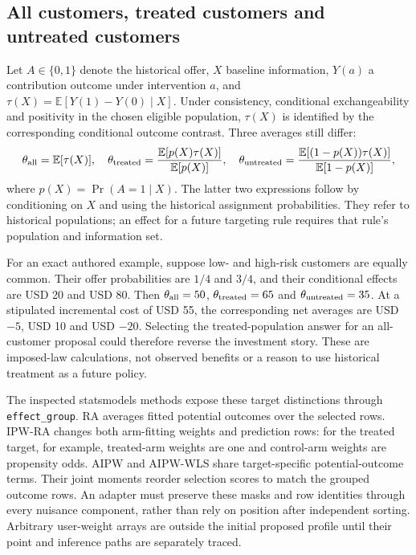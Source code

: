 \subsection{All customers, treated customers and untreated customers}
\label{exec20:pyfx-population}
Let $A\in\{0,1\}$ denote the historical offer, $X$ baseline information,
$Y(a)$ a contribution outcome under intervention $a$, and
$\tau(X)=\mathbb E[Y(1)-Y(0)\mid X]$. Under consistency, conditional
exchangeability and positivity in the chosen eligible population,
$\tau(X)$ is identified by the corresponding conditional outcome contrast.
Three averages still differ:
\begin{equation}
 \theta_{\rm all}=\mathbb E[\tau(X)],\quad
 \theta_{\rm treated}=\frac{\mathbb E[p(X)\tau(X)]}{\mathbb E[p(X)]},\quad
 \theta_{\rm untreated}=\frac{\mathbb E[(1-p(X))\tau(X)]}{\mathbb E[1-p(X)]},
 \label{exec20:pyfx-targets}
\end{equation}
where $p(X)=\Pr(A=1\mid X)$. The latter two expressions follow by conditioning
on $X$ and using the historical assignment probabilities. They refer to
historical populations; an effect for a future targeting rule requires that
rule's population and information set.

For an exact authored example, suppose low- and high-risk customers are
equally common. Their offer probabilities are $1/4$ and $3/4$, and their
conditional effects are USD 20 and USD 80. Then
$\theta_{\rm all}=50$, $\theta_{\rm treated}=65$ and
$\theta_{\rm untreated}=35$. At a stipulated incremental cost of USD 55,
the corresponding net averages are USD $-5$, USD 10 and USD $-20$.
Selecting the treated-population answer for an all-customer proposal could
therefore reverse the investment story. These are imposed-law calculations,
not observed benefits or a reason to use historical treatment as a future
policy.~\citep{exec20_python_effect_reference}

The inspected statsmodels methods expose these target distinctions through
\texttt{effect\_group}. RA averages fitted potential outcomes over the
selected rows. IPW-RA changes both arm-fitting weights and prediction rows:
for the treated target, for example, treated-arm weights are one and
control-arm weights are propensity odds. AIPW and AIPW-WLS share
target-specific potential-outcome terms. Their joint moments reorder
selection scores to match the grouped outcome rows. An adapter must preserve
these masks and row identities through every nuisance component, rather
than rely on position after independent sorting. Arbitrary user-weight
arrays are outside the initial proposed profile until their point and
inference paths are separately traced.~\citep{exec20_python_effect_source}

